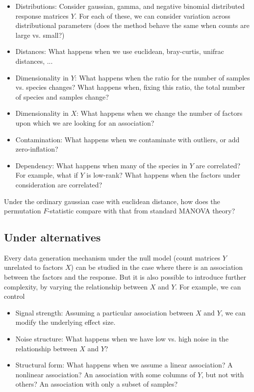 \documentclass{article}
\begin{document}
\begin{itemize}
  \item Distributions: Consider gaussian, gamma, and negative binomial
    distributed response matrices $Y$. For each of these, we can consider
    variation across distributional parameters (does the method behave the same
    when counts are large vs. small?)
  \item Distances: What happens when we use euclidean, bray-curtis, unifrac distances, ...
  \item Dimensionality in $Y$: What happens when the ratio for the number of
    samples vs. species changes? What happens when, fixing this ratio, the total
    number of species and samples change?
  \item Dimensionality in $X$: What happens when we change the number of factors
    upon which we are looking for an association?
  \item Contamination: What happens when we contaminate with outliers, or add
    zero-inflation?
  \item Dependency: What happens when many of the species in $Y$ are correlated?
    For example, what if $Y$ is low-rank? What happens when the factors under
    consideration are correlated?
\end{itemize}

Under the ordinary gaussian case with euclidean distance, how does the
permutation $F$-statistic compare with that from standard MANOVA theory?

\subsection{Under alternatives}

Every data generation mechanism under the null model (count matrices $Y$
unrelated to factors $X$) can be studied in the case where there is an
association between the factors and the response. But it is also possible to
introduce further complexity, by varying the relationship between $X$ and $Y$.
For example, we can control
\begin{itemize}
\item Signal strength: Assuming a particular association between $X$ and $Y$, we
  can modify the underlying effect size.
\item Noise structure: What happens when we have low vs. high noise in the
  relationship between $X$ and $Y$?
\item Structural form: What happens when we assume a linear association? A
  nonlinear association? An association with some columns of $Y$, but not with
  others? An association with only a subset of samples?
\end{itemize}
\end{document}

